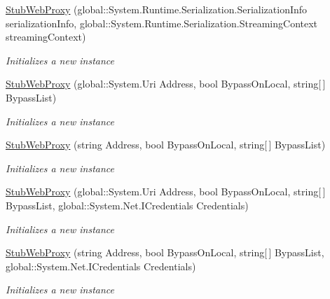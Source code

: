 \begin{DoxyCompactItemize}
\hyperlink{class_system_1_1_net_1_1_fakes_1_1_stub_web_proxy_a860a70657a413ee7d6330e3ee545d6d0}{Stub\-Web\-Proxy} (global\-::\-System.\-Runtime.\-Serialization.\-Serialization\-Info serialization\-Info, global\-::\-System.\-Runtime.\-Serialization.\-Streaming\-Context streaming\-Context)
\begin{DoxyCompactList}\small\item\em Initializes a new instance\end{DoxyCompactList}\item 
\hyperlink{class_system_1_1_net_1_1_fakes_1_1_stub_web_proxy_adfe1580462d1b74db505c5df6a65b63a}{Stub\-Web\-Proxy} (global\-::\-System.\-Uri Address, bool Bypass\-On\-Local, string\mbox{[}$\,$\mbox{]} Bypass\-List)
\begin{DoxyCompactList}\small\item\em Initializes a new instance\end{DoxyCompactList}\item 
\hyperlink{class_system_1_1_net_1_1_fakes_1_1_stub_web_proxy_aa1e0f2a7907ee085e24dd59f51e27cb5}{Stub\-Web\-Proxy} (string Address, bool Bypass\-On\-Local, string\mbox{[}$\,$\mbox{]} Bypass\-List)
\begin{DoxyCompactList}\small\item\em Initializes a new instance\end{DoxyCompactList}\item 
\hyperlink{class_system_1_1_net_1_1_fakes_1_1_stub_web_proxy_a96ce155e259bdc145d80a25eab87bb07}{Stub\-Web\-Proxy} (global\-::\-System.\-Uri Address, bool Bypass\-On\-Local, string\mbox{[}$\,$\mbox{]} Bypass\-List, global\-::\-System.\-Net.\-I\-Credentials Credentials)
\begin{DoxyCompactList}\small\item\em Initializes a new instance\end{DoxyCompactList}\item 
\hyperlink{class_system_1_1_net_1_1_fakes_1_1_stub_web_proxy_a392ae26b7b094463d660c8437eb0db7e}{Stub\-Web\-Proxy} (string Address, bool Bypass\-On\-Local, string\mbox{[}$\,$\mbox{]} Bypass\-List, global\-::\-System.\-Net.\-I\-Credentials Credentials)
\begin{DoxyCompactList}\small\item\em Initializes a new instance\end{DoxyCompactList}\end{DoxyCompactItemize}
